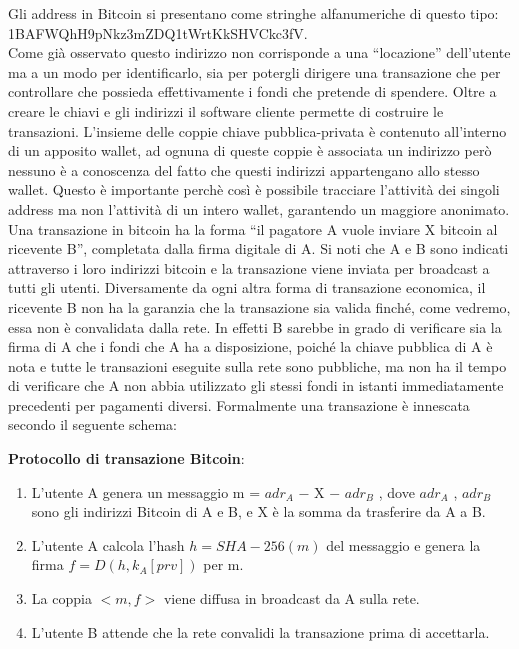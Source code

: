 Gli address in Bitcoin si presentano come stringhe alfanumeriche di questo tipo: 1BAFWQhH9pNkz3mZDQ1tWrtKkSHVCkc3fV.\\Come già osservato questo indirizzo non corrisponde a una “locazione” dell'utente ma a un modo per identiﬁcarlo, sia per potergli dirigere una transazione che per controllare che possieda eﬀettivamente i fondi che pretende di spendere. Oltre a creare le chiavi e gli indirizzi il software cliente permette di costruire le transazioni. L'insieme delle coppie chiave pubblica-privata è contenuto all'interno di un apposito wallet, ad ognuna di queste coppie è associata un indirizzo però nessuno è a conoscenza del fatto che questi indirizzi appartengano allo stesso wallet. Questo è importante perchè così è possibile tracciare l'attività dei singoli address ma non l'attività di un intero wallet, garantendo un maggiore anonimato. Una transazione in bitcoin ha la forma “il pagatore A vuole inviare X bitcoin al ricevente B”, completata dalla ﬁrma digitale di A. Si noti che A e B sono indicati attraverso i loro indirizzi bitcoin e la transazione viene inviata per broadcast a tutti gli utenti. Diversamente da ogni altra forma di transazione economica, il ricevente B non ha la garanzia che la transazione sia valida ﬁnché, come vedremo, essa non è convalidata dalla rete. In eﬀetti B sarebbe in grado di veriﬁcare sia la ﬁrma di A che i fondi che A ha a disposizione, poiché la chiave pubblica di A è nota e tutte le transazioni eseguite sulla rete sono pubbliche, ma non ha il tempo di veriﬁcare che A non abbia utilizzato gli stessi fondi in istanti immediatamente precedenti per pagamenti diversi. Formalmente una transazione è innescata secondo il seguente schema:
\begin{center}
\textbf{Protocollo di transazione Bitcoin}:
\begin{enumerate}
    \item L’utente A genera un messaggio m = $adr_A$ $-$ X $-$ $adr_B$ , dove $adr_A$ , $adr_B$ sono gli indirizzi Bitcoin di A e B, e X è la somma da trasferire da A a B.
    \item L’utente A calcola l’hash $h = SHA-256(m)$ del messaggio e genera la ﬁrma $f = D(h, k_A [prv])$ per m.
    \item La coppia $<m, f>$ viene diffusa in broadcast da A sulla rete.
    \item L’utente B attende che la rete convalidi la transazione prima di accettarla.
\end{enumerate}
\end{center}
